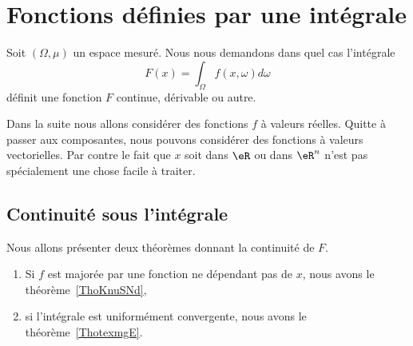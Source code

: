 \section{Fonctions définies par une intégrale}
\label{SecCHwnBDj}

Soit \( (\Omega,\mu)\) un espace mesuré. Nous nous demandons dans quel cas l'intégrale
\begin{equation}
    F(x)=\int_{\Omega}f(x,\omega)d\omega
\end{equation}
définit une fonction \( F\) continue, dérivable ou autre.

Dans la suite nous allons considérer des fonctions \( f\) à valeurs réelles. Quitte à passer aux composantes, nous pouvons considérer des fonctions à valeurs vectorielles. Par contre le fait que \( x\) soit dans \( \eR\) ou dans \( \eR^n\) n'est pas spécialement une chose facile à traiter.

\subsection{Continuité sous l'intégrale}

Nous allons présenter deux théorèmes donnant la continuité de \( F\).
\begin{enumerate}
    \item
        Si \( f\) est majorée par une fonction ne dépendant pas de \( x\), nous avons le théorème~\ref{ThoKnuSNd},
    \item
        si l'intégrale est uniformément convergente, nous avons le théorème~\ref{ThotexmgE}.
\end{enumerate}

